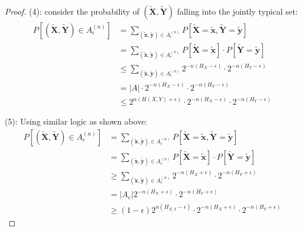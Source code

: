 \documentclass{article}
\newcommand{\norm}[1]{\vert {#1} \vert}
\begin{document}
\begin{proof}
        (4): consider the probability of $(\tilde{\mathbf{X}}, \tilde{\mathbf{Y}})$ falling into the jointly typical set:
        \begin{equation*}
            \begin{aligned}
                P[(\tilde{\mathbf{X}}, \tilde{\mathbf{Y}}) \in A_\epsilon^{(n)}]
                &= \sum_{(\tilde{\mathbf{x}}, \tilde{\mathbf{y}}) \in A_\epsilon^{(n)}}
                    P[
                        \tilde{\mathbf{X}} = \tilde{\mathbf{x}},
                        \tilde{\mathbf{Y}} = \tilde{\mathbf{y}}
                    ] \\
                &= \sum_{(\tilde{\mathbf{x}}, \tilde{\mathbf{y}}) \in A_\epsilon^{(n)}}
                    P[\tilde{\mathbf{X}} = \tilde{\mathbf{x}}] \cdot
                    P[\tilde{\mathbf{Y}} = \tilde{\mathbf{y}}] \\
                &\leq \sum_{(\tilde{\mathbf{x}}, \tilde{\mathbf{y}}) \in A_\epsilon^{(n)}}
                    2^{-n(H_X - \epsilon)} \cdot 2^{-n(H_Y - \epsilon)} \\
                &= \norm{A} \cdot 2^{-n(H_X - \epsilon)} \cdot 2^{-n(H_Y - \epsilon)} \\
                &\leq 2^{n(H(X, Y) + \epsilon)} 
                    \cdot 2^{-n(H_X - \epsilon)} \cdot 2^{-n(H_Y - \epsilon)}
            \end{aligned}
        \end{equation*}

        (5): Using similar logic as shown above:
        \begin{equation*}
            \begin{aligned}
                P[(\tilde{\mathbf{X}}, \tilde{\mathbf{Y}}) \in A_\epsilon^{(n)}]
                &= \sum_{(\tilde{\mathbf{x}}, \tilde{\mathbf{y}}) \in A_\epsilon^{(n)}}
                    P[
                        \tilde{\mathbf{X}} = \tilde{\mathbf{x}},
                        \tilde{\mathbf{Y}} = \tilde{\mathbf{y}}
                    ] \\
                &= \sum_{(\tilde{\mathbf{x}}, \tilde{\mathbf{y}}) \in A_\epsilon^{(n)}}
                    P[\tilde{\mathbf{X}} = \tilde{\mathbf{x}}] \cdot
                    P[\tilde{\mathbf{Y}} = \tilde{\mathbf{y}}] \\
                &\geq \sum_{(\tilde{\mathbf{x}}, \tilde{\mathbf{y}}) \in A_\epsilon^{(n)}}
                    2^{-n(H_X + \epsilon)} \cdot 2^{-n(H_Y + \epsilon)} \\
                &= \norm{A_e}
                    2^{-n(H_X + \epsilon)} \cdot 2^{-n(H_Y + \epsilon)} \\
                &\geq (1-\epsilon)2^{n(H_{X,Y} - \epsilon)} \cdot
                    2^{-n(H_X + \epsilon)} \cdot 2^{-n(H_Y + \epsilon)}
            \end{aligned}
        \end{equation*}
    \end{proof}
\end{document}
